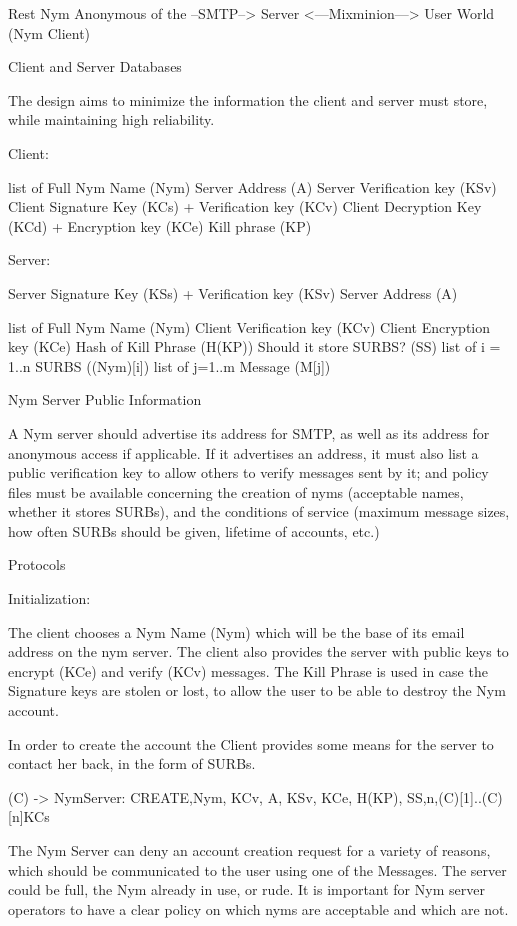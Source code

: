    Rest           Nym                      Anonymous
 of the --SMTP--> Server <---Mixminion---> User
  World                                    (Nym Client)

Client and Server Databases

The design aims to minimize the information the client and server must
store, while maintaining high reliability.

Client:

list of {
  Full Nym Name (Nym)
  Server Address (A)
  Server Verification key (KSv)
  Client Signature Key (KCs) + Verification key (KCv)
  Client Decryption Key (KCd) + Encryption key (KCe)
  Kill phrase (KP)
}

Server:

Server Signature Key (KSs) + Verification key (KSv)
Server Address (A)

list of {
  Full Nym Name (Nym)
  Client Verification key (KCv)
  Client Encryption key (KCe)
  Hash of Kill Phrase (H(KP))
  Should it store SURBS? (SS)
  list of i = 1..n {
    SURBS ((Nym)[i])
  }
  list of j=1..m {
    Message (M[j])
  }
}

Nym Server Public Information

A Nym server should advertise its address for SMTP, as well as its address
for anonymous access if applicable. If it advertises an address, it must
also list a public verification key to allow others to verify messages
sent by it; and policy files must be available concerning the creation
of nyms (acceptable names, whether it stores SURBs), and the conditions
of service (maximum message sizes, how often SURBs should be given,
lifetime of accounts, etc.)

Protocols

Initialization:

The client chooses a Nym Name (Nym) which will be the base of its
email address on the nym server. The client also provides the server
with public keys to encrypt (KCe) and verify (KCv) messages. The Kill
Phrase is used in case the Signature keys are stolen or lost, to allow
the user to be able to destroy the Nym account.

In order to create the account the Client provides some means for the
server to contact her back, in the form of SURBs.

(C) -> NymServer: {CREATE,Nym, KCv, A, KSv, KCe, H(KP), SS,n,(C)[1]..(C)[n]}KCs

The Nym Server can deny an account creation request for a variety of
reasons, which should be communicated to the user using one of the
Messages. The server could be full, the Nym already in use, or rude.
It is important for Nym server operators to have a clear policy on
which nyms are acceptable and which are not.

